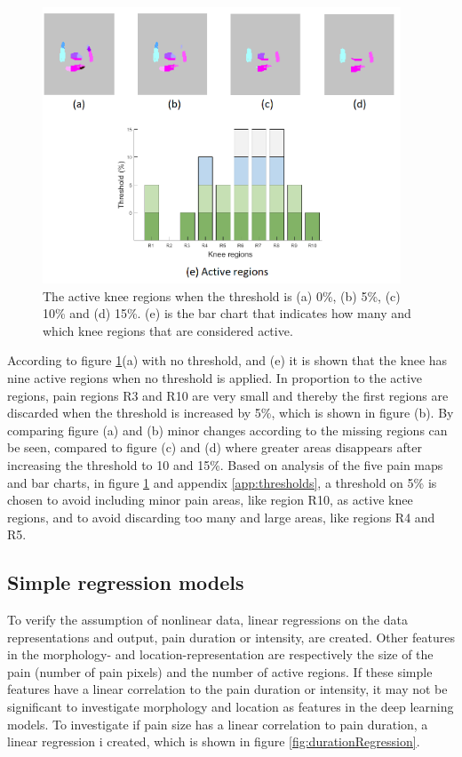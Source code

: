 \begin{figure} [H]
\centering
\includegraphics[width=0.95\textwidth]{figures/threshold4}
\caption{The active knee regions when the threshold is (a) 0\%, (b) 5\%, (c) 10\% and (d) 15\%. (e) is the bar chart that indicates how many and which knee regions that are considered active.}
\label{fig:threshold}
\end{figure}

\noindent
According to figure \ref{fig:threshold}(a) with no threshold, and (e) it is shown that the knee has nine active regions when no threshold is applied. In proportion to the active regions, pain regions R3 and R10 are very small and thereby the first regions are discarded when the threshold is increased by 5\%, which is shown in figure (b).
By comparing figure (a) and (b) minor changes according to the missing regions can be seen, compared to figure (c) and (d) where greater areas disappears after increasing the threshold to 10 and 15\%.
\noindent
Based on analysis of the five pain maps and bar charts, in figure \ref{fig:threshold} and appendix \ref{app:thresholds}, a threshold on 5\% is chosen to avoid including minor pain areas, like region R10, as active knee regions, and to avoid discarding too many and large areas, like regions R4 and R5.


\subsection{Simple regression models}
To verify the assumption of nonlinear data, linear regressions on the data representations and output, pain duration or intensity, are created. 
Other features in the morphology- and location-representation are respectively the size of the pain (number of pain pixels) and the number of active regions. If these simple features have a linear correlation to the pain duration or intensity,  it may not be significant to investigate morphology and location as features in the deep learning models. \newline
\noindent
To investigate if pain size has a linear correlation to pain duration, a linear regression i created, which is shown in figure \ref{fig:durationRegression}.
\newline

